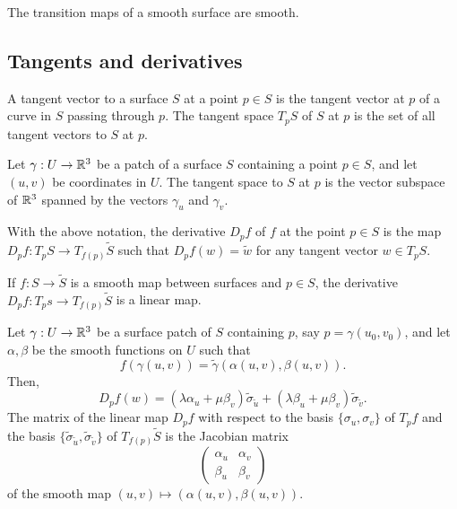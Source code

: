 \begin{proposition}
  The transition maps of a smooth surface are smooth.
\end{proposition}

\subsection{Tangents and derivatives}

\begin{defn}
  A tangent vector to a surface $S$ at a point $p \in S$ is the tangent
  vector at $p$ of a curve in $S$ passing through $p$.
  The tangent space $T_p S$ of $S$ at $p$ is the set of all tangent vectors
  to $S$ at $p$.
\end{defn}

\begin{proposition}
  Let $\gamma: U \to \mathbb{R}^3$ be a patch of a surface $S$ containing a point
  $p \in S$, and let $(u, v)$ be coordinates in $U$.
  The tangent space to $S$ at $p$ is the vector subspace of $\mathbb{R}^3$
  spanned by the vectors $\gamma_u$ and $\gamma_v$.
\end{proposition}

\begin{defn}
  With the above notation, the derivative $D_p f$ of $f$ at the point $p \in S$
  is the map $D_p f: T_p S \to T_{f(p)} \tilde S$ such that $D_p f(w) = \tilde w$
  for any tangent vector $w \in T_p S$.
\end{defn}

\begin{proposition}
  If $f: S \to \tilde S$ is a smooth map between surfaces and $p \in S$,
  the derivative $D_p f: T_p s \to T_{f(p)} \tilde S$ is a linear map.
\end{proposition}

Let $\gamma: U \to \mathbb{R}^3$ be a surface patch of $S$ containing $p$,
say $p = \gamma(u_0, v_0)$, and let $\alpha, \beta$ be the smooth
functions on $U$ such that
\[
  f(\gamma(u, v)) = \tilde \gamma(\alpha(u, v), \beta(u, v)).
\]
Then,
\[
  D_p f(w) = (\lambda \alpha_u + \mu \beta_v) \tilde \sigma_{\tilde u}   + (\lambda \beta_u + \mu \beta_v) \tilde \sigma_{\tilde v}.
\]
The matrix of the linear map $D_p f$ with respect to the basis $\{\sigma_u, \sigma_v\}$
of $T_p f$ and the basis $\{\tilde \sigma_{\tilde u}, \tilde \sigma_{\tilde v}\}$ of
$T_{f(p)} \tilde S$ is the Jacobian matrix
\[
  \begin{pmatrix}
    \alpha_u & \alpha_v \\
    \beta_u & \beta_v
  \end{pmatrix}
\]
of the smooth map $(u, v) \mapsto (\alpha(u, v), \beta(u, v))$.

